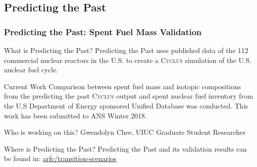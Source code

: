 \newcommand{\Cyclus}{\textsc{Cyclus}\xspace}%
\subsection{Predicting the Past}
\begin{frame}
  \frametitle{Predicting the Past: Spent Fuel Mass Validation}

\begin{block}{What is Predicting the Past? }
Predicting the Past uses published data of the 112 commercial nuclear reactors in the U.S. to create a \Cyclus simulation of the U.S. nuclear fuel cycle.
\end{block}

\begin{block}{Current Work}
Comparison between spent fuel mass and isotopic compositions from the predicting the past \Cyclus output and spent nuclear fuel inventory from the U.S Department of Energy sponsored Unified Database\cite{peterson_unf-st&dards_2017} was conducted. This work has been submitted to ANS Winter 2018.
\end{block}

\begin{block}{Who is working on this?}
Gwendolyn Chee, UIUC Graduate Student Researcher
\end{block}

\begin{block}{Where is Predicting the Past?}
Predicting the Past and its validation results can be found in: \href{https://github.com/arfc/transition-scenarios/tree/master/input/predicting-the-past}{arfc/transition-scenarios} 
\end{block}

\end{frame}
